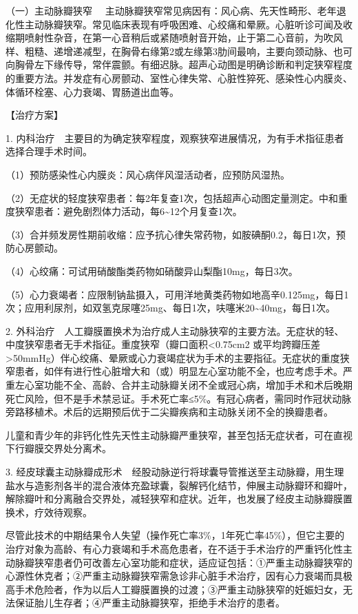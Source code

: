 {（一）主动脉瓣狭窄}
　主动脉瓣狭窄常见病因有：风心病、先天性畸形、老年退化性主动脉瓣狭窄。常见临床表现有呼吸困难、心绞痛和晕厥。心脏听诊可闻及收缩期喷射性杂音，在第一心音稍后或紧随喷射音开始，止于第二心音前，为吹风样、粗糙、递增递减型，在胸骨右缘第2或左缘第3肋间最响，主要向颈动脉、也可向胸骨左下缘传导，常伴震颤。有细迟脉。超声心动图是明确诊断和判定狭窄程度的重要方法。并发症有心房颤动、室性心律失常、心脏性猝死、感染性心内膜炎、体循环栓塞、心力衰竭、胃肠道出血等。

【治疗方案】

1.
内科治疗　主要目的为确定狭窄程度，观察狭窄进展情况，为有手术指征患者选择合理手术时间。

（1）预防感染性心内膜炎：风心病伴风湿活动者，应预防风湿热。

（2）无症状的轻度狭窄患者：每2年复查1次，包括超声心动图定量测定。中和重度狭窄患者：避免剧烈体力活动，每6\textasciitilde{}12个月复查1次。

（3）合并频发房性期前收缩：应予抗心律失常药物，如胺碘酮0.2，每日1次，预防心房颤动。

（4）心绞痛：可试用硝酸酯类药物如硝酸异山梨酯10mg，每日3次。

（5）心力衰竭者：应限制钠盐摄入，可用洋地黄类药物如地高辛0.125mg，每日1次；应用利尿剂，如双氢克尿噻25mg、每日1次，呋噻米20\textasciitilde{}40mg，每日1次。

2.
外科治疗　人工瓣膜置换术为治疗成人主动脉狭窄的主要方法。无症状的轻、中度狭窄患者无手术指征。重度狭窄（瓣口面积\textless{}0.75cm{2}
或平均跨瓣压差\textgreater{}50mmHg）伴心绞痛、晕厥或心力衰竭症状为手术的主要指征。无症状的重度狭窄患者，如伴有进行性心脏增大和（或）明显左心室功能不全，也应考虑手术。严重左心室功能不全、高龄、合并主动脉瓣关闭不全或冠心病，增加手术和术后晚期死亡风险，但不是手术禁忌证。手术死亡率≤5\%。有冠心病者，需同时作冠状动脉旁路移植术。术后的远期预后优于二尖瓣疾病和主动脉关闭不全的换瓣患者。

儿童和青少年的非钙化性先天性主动脉瓣严重狭窄，甚至包括无症状者，可在直视下行瓣膜交界处分离术。

3.
经皮球囊主动脉瓣成形术　经股动脉逆行将球囊导管推送至主动脉瓣，用生理盐水与造影剂各半的混合液体充盈球囊，裂解钙化结节，伸展主动脉瓣环和瓣叶，解除瓣叶和分离融合交界处，减轻狭窄和症状。近年，也发展了经皮主动脉瓣膜置换术，疗效待观察。

尽管此技术的中期结果令人失望（操作死亡率3\%，1年死亡率45\%），但它主要的治疗对象为高龄、有心力衰竭和手术高危患者，在不适于手术治疗的严重钙化性主动脉瓣狭窄患者仍可改善左心室功能和症状，适应证包括：①严重主动脉瓣狭窄的心源性休克者；②严重主动脉瓣狭窄需急诊非心脏手术治疗，因有心力衰竭而具极高手术危险者，作为以后人工瓣膜置换的过渡；③严重主动脉狭窄的妊娠妇女，无法保证胎儿生存者；④严重主动脉瓣狭窄，拒绝手术治疗的患者。

